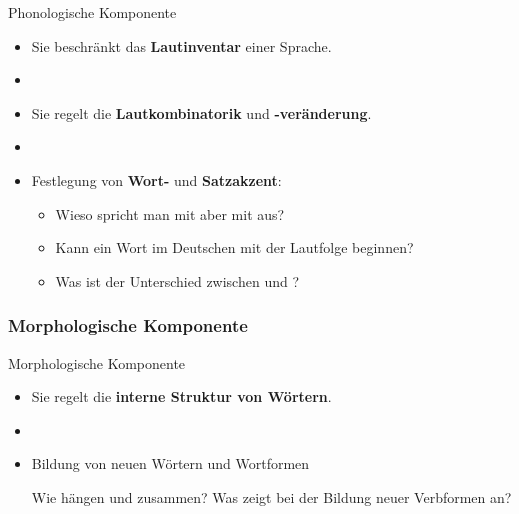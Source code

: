 \begin{frame}{Phonologische Komponente}

	\begin{itemize}
		\item Sie beschränkt das \textbf{Lautinventar} einer Sprache.
		\item[]
		\item Sie regelt die \textbf{Lautkombinatorik} und \textbf{-veränderung}.
		\item[]
		\item Festlegung von \textbf{Wort-} und \textbf{Satzakzent}:
		
\pause
		 \begin{itemize} 
                 \item Wieso spricht man  mit \textipa{[t]} aber  mit \textipa{[d]} aus?
\pause
                 \item Kann ein Wort im Deutschen mit der Lautfolge \textipa{[Ng]} beginnen?
\pause
	         \item Was ist der Unterschied zwischen  und ?
		\end{itemize}	  
	
	\end{itemize}
	
\end{frame}


\subsubsection{Morphologische Komponente}

\begin{frame}{Morphologische Komponente}

\begin{itemize}
	\item Sie regelt die \textbf{interne Struktur von Wörtern}.
	\item[]
	\item Bildung von neuen Wörtern und Wortformen
\pause
				
\ea Wie hängen  und  zusammen?
\pause
	\ex Was zeigt  bei der Bildung neuer Verbformen an?
\z
			
\end{itemize}

\end{frame}


